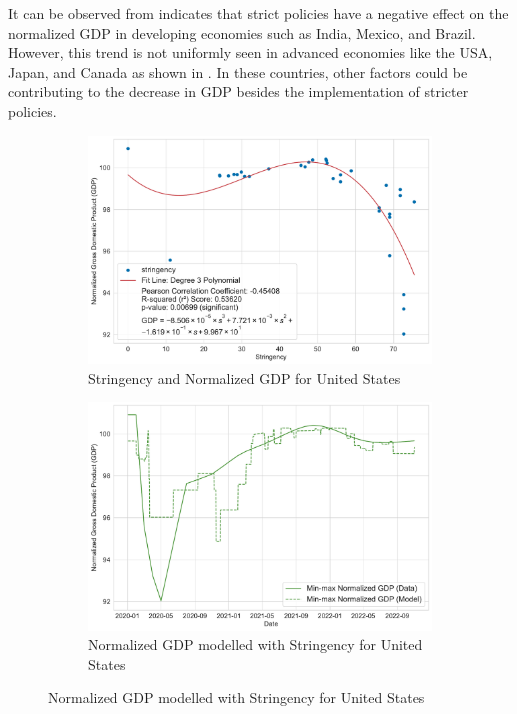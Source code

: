 \documentclass[tikz,fleqn,12pt]{wlscirep}
\begin{document}
It can be observed from  indicates that strict policies have a negative effect on the normalized GDP in developing economies such as India, Mexico, and Brazil. However, this trend is not uniformly seen in advanced economies like the USA, Japan, and Canada as shown in . In these countries, other factors could be contributing to the decrease in GDP besides the implementation of stricter policies.

\begin{figure}[htbp!]
  \centering
  \begin{subfigure}[t]{0.48\textwidth}
    \centering
    \includegraphics[width=\linewidth]{images/stringency_vs_gdp_USA.pdf}
    \caption{Stringency and Normalized GDP for United States}
  \end{subfigure}
  \label{fig:stringency_vs_gdp_USA}
  \hfill
  \begin{subfigure}[t]{0.48\textwidth}
    \centering
    \includegraphics[width=\linewidth]{images/gdp_modelled_with_stringency_USA.pdf}
    \caption{Normalized GDP modelled with Stringency for United States}
  \end{subfigure}
  \label{fig:gdp_modelled_with_stringency_USA}


\end{figure}
\end{document}
